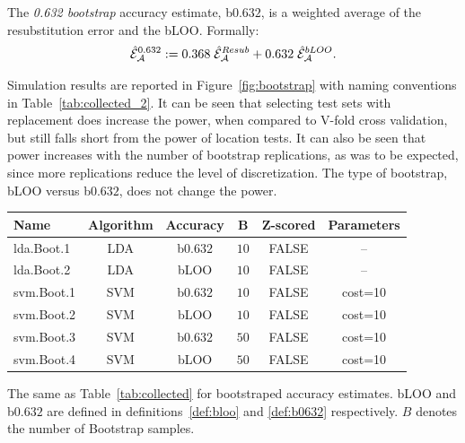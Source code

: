 \documentclass[12pt,a4paper]{article}
\begin{document}
\begin{definition}[b$0.632$]
\label{def:b0632}
The \emph{0.632 bootstrap} accuracy estimate, b$0.632$, is a weighted average of the resubstitution error and the bLOO.
Formally:
\begin{align}
	\hat{\mathcal{E}}_{\mathcal{A}}^{0.632} := 0.368 \; \hat{\mathcal{E}}_{\mathcal{A}}^{Resub}  + 0.632 \; \hat{\mathcal{E}}_{\mathcal{A}}^{bLOO}.
\end{align}
\end{definition}
Simulation results are reported in Figure~\ref{fig:bootstrap} with naming conventions in Table~\ref{tab:collected_2}.
It can be seen that selecting test sets with replacement does increase the power, when compared to V-fold cross validation, but still falls short from the power of location tests. 
It can also be seen that power increases with the number of bootstrap replications, as was to be expected, since more replications reduce the level of discretization.
The type of bootstrap, bLOO versus b$0.632$, does not change the power. 

\bigskip

\begin{tcolorbox}
\centering
\begin{tabular}{l|c|c|c|c|c}
Name & Algorithm & Accuracy & B & Z-scored & Parameters\\ 
\hline
\hline
lda.Boot.1 & LDA & b$0.632$ & $10$ & FALSE &  -- \\ 
lda.Boot.2 & LDA & bLOO 	& $10$ & FALSE &  -- \\ 
svm.Boot.1 & SVM & b$0.632$ & $10$ & FALSE & cost=10 \\ 
svm.Boot.2 & SVM & bLOO 	& $10$ & FALSE & cost=10 \\ 
svm.Boot.3 & SVM & b$0.632$ & $50$ & FALSE & cost=10 \\ 
svm.Boot.4 & SVM & bLOO 	& $50$ & FALSE & cost=10 \\ 
\end{tabular} 
\captionsetup{type=table}
\caption{
The same as Table~\ref{tab:collected} for bootstraped accuracy estimates. 
bLOO and b$0.632$ are defined in definitions~\ref{def:bloo} and \ref{def:b0632} respectively.
$B$ denotes the number of Bootstrap samples. } 
\label{tab:collected_2}
\end{tcolorbox}
\end{document}
